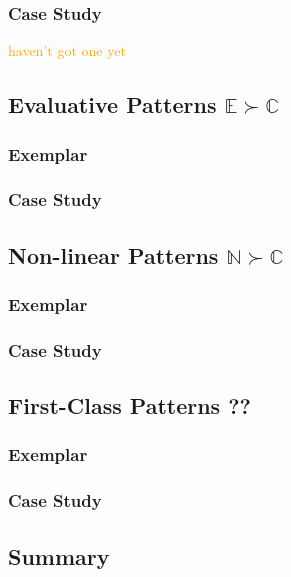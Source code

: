 \documentclass[acmsmall]{acmart}
\renewcommand\todo[1]{\textcolor{orange}{#1}}
\begin{document}
\subsubsection{Case Study}

\todo{haven't got one yet}

\subsection{Evaluative Patterns $\mathbb{E} \succ \mathbb{C}$}
\label{sec:evaluative}
\subsubsection{Exemplar}
\subsubsection{Case Study}

\subsection{Non-linear Patterns $\mathbb{N} \succ \mathbb{C}$}
\label{sec:non-linear}
\subsubsection{Exemplar}
\subsubsection{Case Study}

\subsection{First-Class Patterns ??}
\label{sec:first-class}
\subsubsection{Exemplar}
\subsubsection{Case Study}

\subsection{Summary}
\end{document}
